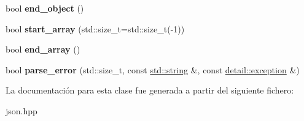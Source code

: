 \begin{DoxyCompactItemize}
\item 
\mbox{\label{classnlohmann_1_1detail_1_1json__sax__acceptor_a919645fd1827a561a994d70a435e3f19}} 
bool {\bfseries end\+\_\+object} ()
\item 
\mbox{\label{classnlohmann_1_1detail_1_1json__sax__acceptor_a8238e8090cbb4ed8a22cbc97bfb833a5}} 
bool {\bfseries start\+\_\+array} (std\+::size\+\_\+t=std\+::size\+\_\+t(-\/1))
\item 
\mbox{\label{classnlohmann_1_1detail_1_1json__sax__acceptor_a22ef94ca5476a9563dcaca15b7d6e654}} 
bool {\bfseries end\+\_\+array} ()
\item 
\mbox{\label{classnlohmann_1_1detail_1_1json__sax__acceptor_a95bb3e8b6feaa523ecda8106fb5e38e3}} 
bool {\bfseries parse\+\_\+error} (std\+::size\+\_\+t, const \mbox{\hyperlink{namespacenlohmann_1_1detail_a1ed8fc6239da25abcaf681d30ace4985ab45cffe084dd3d20d928bee85e7b0f21}{std\+::string}} \&, const \mbox{\hyperlink{classnlohmann_1_1detail_1_1exception}{detail\+::exception}} \&)
\end{DoxyCompactItemize}


La documentación para esta clase fue generada a partir del siguiente fichero\+:\begin{DoxyCompactItemize}
\item 
json.\+hpp\end{DoxyCompactItemize}
